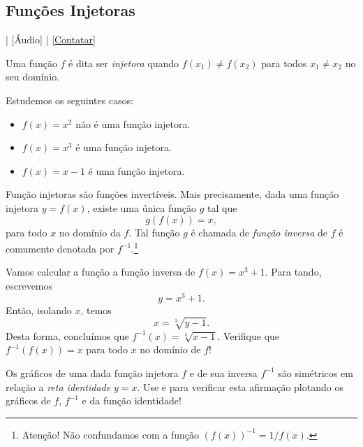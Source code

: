 \subsection{Funções Injetoras}

\begin{flushright}
  [Vídeo] | [Áudio] | \href{https://phkonzen.github.io/notas/contato.html}{[Contatar]}
\end{flushright}

Uma função $f$ é dita ser \emph{injetora} quando $f(x_1)\neq f(x_2)$ para todos $x_1\neq x_2$ no seu domínio.

\begin{ex}
  Estudemos os seguintes casos:
  \begin{itemize}
  \item $f(x) = x^2$ não é uma função injetora.
  \item $f(x) = x^3$ é uma função injetora.
  \item $f(x) = x-1$ é uma função injetora.
  \end{itemize}
\end{ex}

Função injetoras são funções invertíveis. Mais precisamente, dada uma função injetora $y = f(x)$, existe uma única função $g$ tal que
\begin{equation}
  g(f(x)) = x,
\end{equation}
para todo $x$ no domínio da $f$. Tal função $g$ é chamada de \emph{função inversa} de $f$ é comumente denotada por $f^{-1}$.\footnote{Atenção! Não confundamos com a função $(f(x))^{-1} = 1/f(x)$.}

\begin{ex}
  Vamos calcular a função a função inversa de $f(x) = x^3 + 1$. Para tando, escrevemos
  \begin{equation}
    y = x^3 + 1.
  \end{equation}
  Então, isolando $x$, temos
  \begin{equation}
    x = \sqrt[3]{y - 1}.
  \end{equation}
  Desta forma, concluímos que $f^{-1}(x) = \sqrt[3]{x-1}$. Verifique que $f^{-1}(f(x)) = x$ para todo $x$ no domínio de $f$!
\end{ex}

\begin{obs}
  Os gráficos de uma dada função injetora $f$ e de sua inversa $f^{-1}$ são simétricos em relação a \emph{reta identidade} $y=x$.
  \ifispython
  Use {\python} e {\sympy} para verificar esta afirmação plotando os gráficos de $f$, $f^{-1}$ e da função identidade!
  \fi
\end{obs}

